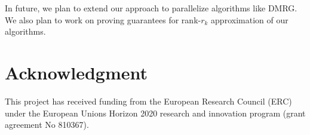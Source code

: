\documentclass[runningheads]{llncs}
\begin{document}
In future, we plan to extend our approach to parallelize algorithms like DMRG. We also plan to work on proving guarantees for rank-$r_k$ approximation of our algorithms.


\section*{Acknowledgment}
\noindent This project has received funding from the European Research Council (ERC) under the European Unions Horizon 2020 research and innovation program (grant agreement No 810367).

%
%
%
 
 
\end{document}
